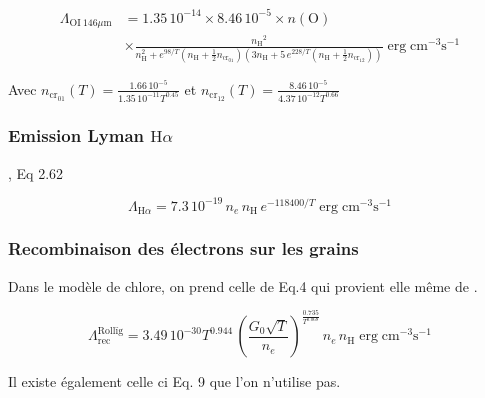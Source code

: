 \begin{equation}
\begin{split}
    \Lambda_{\mathrm{OI}\ 146 \mu \mathrm{m}} &= 1.35\,10^{-14} \times 8.46\,10^{-5} \times 
    n(\mathrm{O}) \\
    & \times \frac{ {n_\mathrm{H}}^2 }{n_\mathrm{H}^2+ e^{98/T}(n_\mathrm{H} + \frac{1}{2} n_{\mathrm{cr}_{01}} ) (3 n_\mathrm{H} + 5\, e^{228/T} (n_\mathrm{H} + \frac{1}{2} n_{\mathrm{cr}_{12}} )) } \operatorname{erg} \mathrm{cm}^{-3} \mathrm{s}^{-1}
\end{split}
\end{equation}

Avec $n_{\mathrm{cr}_{01}}(T) = \frac{1.66\,10^{-5} }{1.35\,10^{-11} T^{0.45}} $ et $n_{\mathrm{cr}_{12}}(T) = \frac{8.46\,10^{-5} }{4.37\,10^{-12} T^{0.66}} $


\subsubsection{Emission Lyman $\mathrm{H}\alpha$}

\cite{tielens2005}, Eq 2.62

\begin{equation}
    \Lambda_{\mathrm{H}\alpha} = 7.3\, 10^{-19}\,n_e\,n_\mathrm{H}\,e^{-118400/T} \operatorname{erg} \mathrm{cm}^{-3} \mathrm{s}^{-1}
\end{equation}


\subsubsection{Recombinaison des électrons sur les grains}

Dans le modèle de chlore, on prend celle de \cite{Rollig2005} Eq.4  qui provient elle même de \cite{BakesTielens1994}.

\begin{equation}
    \Lambda_{\mathrm{rec}}^{\mathrm{Rollïg}} = 3.49\,10^{-30} T^{0.944} \, (\frac{G_0 \sqrt{T}}{n_e})^{\frac{0.735}{T^{0.068}}} \, n_e \, n_\mathrm{H} \operatorname{erg} \mathrm{cm}^{-3} \mathrm{s}^{-1}
\end{equation}

Il existe également celle ci \cite{WolfireHollenbachMcKeeTielensBakes_1995} Eq. 9 que l'on n'utilise pas.

